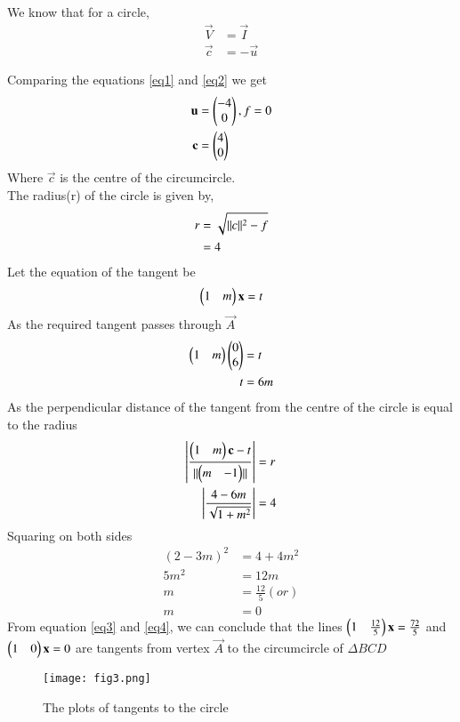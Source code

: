 \documentclass[journal,12pt,twocolumn]{IEEEtran}
\begin{document}
We know that for a circle,
\begin{align}
    \vec{V}&=\vec{I}\\
    \vec{c}&=-\vec{u}
\end{align}

Comparing the equations \ref{eq1} and \ref{eq2} we get
\begin{align}
    \mathbf{u}&=\begin{pmatrix}-4\\0\end{pmatrix},f=0\\
    \mathbf{c}&=\begin{pmatrix}4\\0\end{pmatrix}
\end{align}
Where $\vec{c}$ is the centre of the circumcircle.\\
The radius(r) of the circle is given by,
\begin{align}
    r & = \sqrt{\lVert c\rVert^{2}-f}\\
      & = 4
\end{align}
Let the equation of the tangent be 
\begin{align}
\label{eq3}
    \begin{pmatrix}1&m\end{pmatrix}\mathbf{x} = t
\end{align}
As the required tangent passes through $\vec{A}$
\begin{align}
    \begin{pmatrix}1&m\end{pmatrix}\begin{pmatrix}0\\6\end{pmatrix}&=t\\
    t&=6m
    \label{eq4}
\end{align}
As the perpendicular distance of the tangent from the centre of the circle is equal to the radius 
\begin{align}
    \left|{\frac{\begin{pmatrix}1&m\end{pmatrix}\mathbf{c}-t}{\lVert\begin{pmatrix}m&-1\end{pmatrix}\rVert}}\right|&=r\\
    \left|\frac{4-6m}{\sqrt{1+m^{2}}}\right|&=4
\end{align}
Squaring on both sides
\begin{align}
    (2-3m)^{2}&=4+4m^{2}\\
    5m^{2}&=12m\\
    m&=\frac{12}{5} (or)\\
    m&=0
\end{align}
From equation \ref{eq3} and \ref{eq4}, we can conclude that the lines $\begin{pmatrix}1&\frac{12}{5}\end{pmatrix}\mathbf{x}=\frac{72}{5}$ and $\begin{pmatrix}1&0\end{pmatrix}\mathbf{x}=0$ are tangents from vertex $\vec{A}$ to the circumcircle of $\Delta BCD$ 
\begin{figure}[!ht]
   \centering
   \texttt{[image: fig3.png]}
   \caption{The plots of tangents to the circle}
\end{figure}
\end{document}
